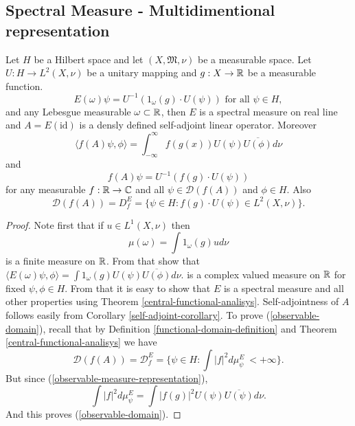 \documentclass[main.tex]{subfiles}
\begin{document}
\subsection{Spectral Measure - Multidimentional representation}
\begin{theorem}
\label{observable-representation}
Let $H$ be a Hilbert space and let $(X, \mathfrak{M}, \nu)$ be a measurable space. Let $U:H\to L^2(X, \nu)$ be a unitary mapping and $g:X\to \mathbb{R}$ be a measurable function.
\begin{equation}
E(\omega)\psi = U^{-1}(1_\omega(g)\cdot U(\psi)) \text{ for all } \psi\in H,
\end{equation}
and any Lebesgue measurable $\omega\subset\mathbb{R}$, 
then $E$ is a spectral measure on real line 
and $A = E(\text{id})$ is a densly defined self-adjoint linear operator. Moreover
\begin{equation}
\langle f(A)\psi, \phi \rangle = \int_{-\infty}^{\infty} f(g(x)) U(\psi)\overline{U(\phi)} d\nu 
\end{equation}
and
\begin{equation}
f(A)\psi = U^{-1}(f(g)\cdot U(\psi))
\end{equation}
for any measurable $f:\mathbb{R}\to\mathbb{C}$ and all $\psi\in\mathcal{D}(f(A))$ and $\phi\in H$.
Also 
\begin{equation}
\label{observable-domain}
\mathcal{D}(f(A)) = D^E_f = \{\psi\in H: f(g)\cdot U(\psi)\in L^2(X, \nu)\}.
\end{equation}
\end{theorem}
\begin{proof}
Note first that if $u\in L^1(X,\nu)$ then 
\begin{equation}
\label{observable-measure-representation}
\mu(\omega) = \int 1_\omega(g)ud\nu
\end{equation}
is a finite measure on $\mathbb{R}$. From that show that
$\langle E(\omega)\psi,\phi \rangle = \int 1_\omega(g)U(\psi)\overline{U(\phi)}d\nu.$ is a complex valued measure on $\mathbb{R}$ for fixed $\psi, \phi\in H$. From that it is easy to show that $E$ is a spectral measure and all other properties using Theorem \ref{central-functional-analisys}. Self-adjointness of $A$ follows easily from Corollary \ref{self-adjoint-corollary}.
To prove (\ref{observable-domain}), recall that by Definition \ref{functional-domain-definition} and Theorem \ref{central-functional-analisys} we have
\begin{equation}
\mathcal{D}(f(A)) = \mathcal{D}^E_f = \{\psi\in H: \int |f|^2 d\mu^E_\psi\ < +\infty\}.
\end{equation}
But since (\ref{observable-measure-representation}),
\begin{equation}
\int |f|^2 d\mu^E_\psi = \int |f(g)|^2 U(\psi)\overline{U(\psi)}d\nu.
\end{equation}
And this proves (\ref{observable-domain}).
\end{proof}
\end{document}
